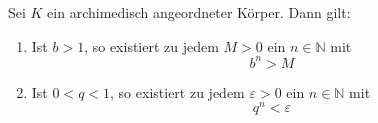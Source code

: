 Sei $K$ ein archimedisch angeordneter Körper. Dann gilt:

\begin{enumerate}[label=\alph*)]

    \item Ist $b > 1$, so existiert zu jedem $M > 0$ ein $n \in \mathbb{N}$ mit
    $$b^n > M$$
   
    \item Ist $0 < q < 1$, so existiert zu jedem $\varepsilon > 0$ ein $n \in \mathbb{N}$ mit
   $$q^n < \varepsilon$$
   
\end{enumerate}